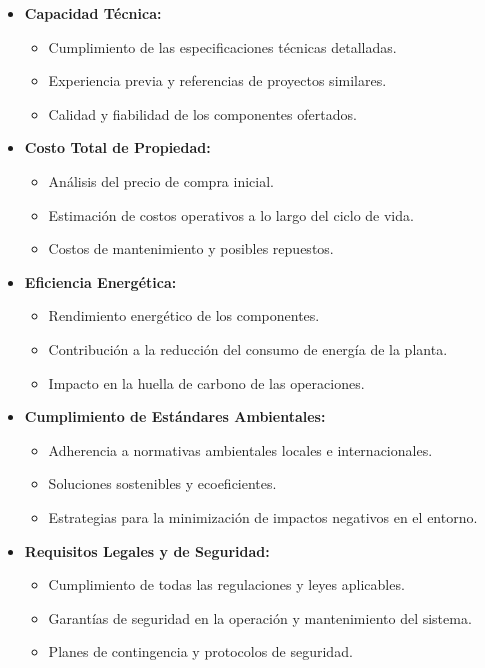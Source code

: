\documentclass[11pt,a4paper]{article}  %
\begin{document}
\begin{itemize}
    \item \textbf{Capacidad Técnica:}
    \begin{itemize}
        \item Cumplimiento de las especificaciones técnicas detalladas.
        \item Experiencia previa y referencias de proyectos similares.
        \item Calidad y fiabilidad de los componentes ofertados.
    \end{itemize}

    \item \textbf{Costo Total de Propiedad:}
    \begin{itemize}
        \item Análisis del precio de compra inicial.
        \item Estimación de costos operativos a lo largo del ciclo de vida.
        \item Costos de mantenimiento y posibles repuestos.
    \end{itemize}

    \item \textbf{Eficiencia Energética:}
    \begin{itemize}
        \item Rendimiento energético de los componentes.
        \item Contribución a la reducción del consumo de energía de la planta.
        \item Impacto en la huella de carbono de las operaciones.
    \end{itemize}

    \item \textbf{Cumplimiento de Estándares Ambientales:}
    \begin{itemize}
        \item Adherencia a normativas ambientales locales e internacionales.
        \item Soluciones sostenibles y ecoeficientes.
        \item Estrategias para la minimización de impactos negativos en el entorno.
    \end{itemize}

    \item \textbf{Requisitos Legales y de Seguridad:}
    \begin{itemize}
        \item Cumplimiento de todas las regulaciones y leyes aplicables.
        \item Garantías de seguridad en la operación y mantenimiento del sistema.
        \item Planes de contingencia y protocolos de seguridad.
    \end{itemize}
\end{itemize}
\end{document}

